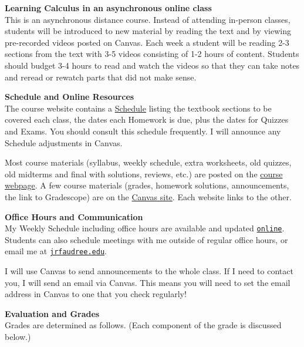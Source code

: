 \documentclass[12pt]{article}
\renewcommand{\emph}[1]{\textsf{\textbf{#1}}}
\newcommand{\localhead}[1]{\par\smallskip\textbf{#1} \smallskip\nobreak\\}%
\def\heading#1{\localhead{\large\emph{#1}}}
\begin{document}
\heading{Learning Calculus in an asynchronous online class}
This is an asynchronous distance course. Instead of attending in-person classes, students will be introduced to new material by reading the text and by viewing pre-recorded videos posted on Canvas. Each week a student  will be reading 2-3 sections from the text with 3-5 videos consisting of 1-2 hours of content. Students should budget 3-4 hours to read and watch the
videos so that they can take notes and reread or rewatch parts that did not make sense.

\heading{Schedule and Online Resources}
The course website contains a \href{https://docs.google.com/spreadsheets/d/e/2PACX-1vSetyTdOP14yatuWNH7CuB9yCT3zqOhFWYmCj1BzRAZhU4eHCXCJaRjnCgxgZW_NieE59iLRok3NdzK/pubhtml?gid=0&single=true}{Schedule} listing the textbook sections to be covered each class, the dates each Homework is due, plus the dates for Quizzes and Exams. You should consult this schedule frequently.  I will announce any Schedule adjustments in Canvas.

Most course materials (syllabus, weekly schedule, extra worksheets, old quizzes, old midterms and final with solutions, reviews, etc.) are posted on the \href{https://uaf-math251.github.io/calc2/}{course webpage}.  A few course materials (grades, homework solutions, announcements, the link to Gradescope) are on the \href{https://canvas.alaska.edu/courses/18799}{Canvas site}.  Each website links to the other.


\heading{Office Hours and Communication}
My Weekly Schedule including office hours are available and updated \href{https://docs.google.com/spreadsheets/d/e/2PACX-1vSPkx0I1WQikJjmR8qs8wpf2oWcwO8CFS2VwCZYsdusMDkxTIQuOVwcV8LfAtsDtUGoj49xCS1mOIrW/pubhtml}{\texttt{online}}.  Students can also schedule meetings with me outside of regular office hours, or email me at \href{mailto:jrfaudree@alaska.edu}{\texttt{jrfaudree\@@alaska.edu}}.

I will use Canvas to send announcements to the whole class. If I need to contact you, I will send an email via Canvas.  This means you will need to set the email address in Canvas to one that you check regularly!


\heading{Evaluation and Grades}
Grades are determined as follows.  (Each component of the grade is discussed below.)
 
\end{document}
